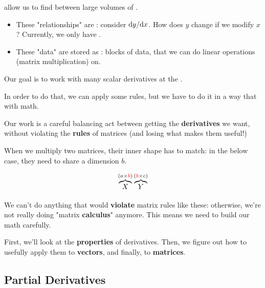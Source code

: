     \begin{concept}
         allow us to find  between large volumes of .
        
        \begin{itemize}
            \item These "relationships" are : consider ${\dd y}/{\dd x}$. How does $y$ change if we modify $x$? Currently, we only have .
            
            \item These "data" are stored as : blocks of data, that we can do linear operations (matrix multiplication) on.
        \end{itemize}
        
        Our goal is to work with many scalar derivatives at the . 
        
        In order to do that, we can apply some  rules, but we have to do it in a way that  with  math.
    \end{concept}
    
    Our work is a careful balancing act between getting the \textbf{derivatives} we want, without violating the \textbf{rules} of matrices (and losing what makes them useful!)
    
    \miniex When we multiply two matrices, their inner shape has to match: in the below case, they need to share a dimension $b$.
    
    \begin{equation}
        \overbrace{
            X
        }^{ (a \times \textcolor{red}{b}) }
        \overbrace{
            Y
        }^{(\textcolor{red}{b} \times c)}
    \end{equation}
    
    We can't do anything that would \textbf{violate} matrix rules like these: otherwise, we're not really doing "matrix \textbf{calculus}" anymore. This means we need to build our math carefully.
    
    First, we'll look at the \textbf{properties} of derivatives. Then, we figure out how to usefully apply them to \textbf{vectors}, and finally, to \textbf{matrices}.
    
    \secdiv
    
    \subsection{Partial Derivatives}
    
